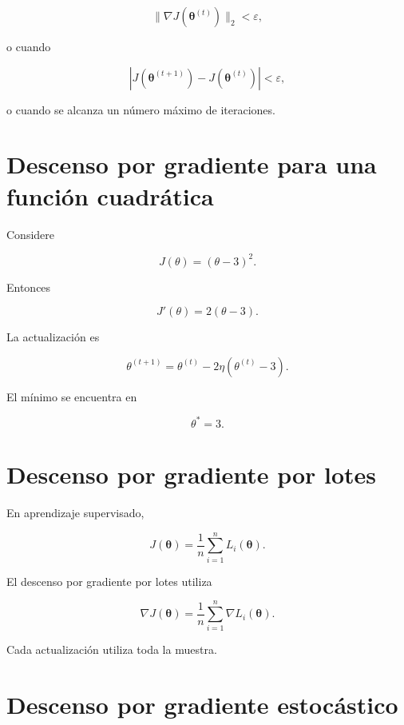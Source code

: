 \documentclass[
  spanish,
  10.5pt,
  letterpaper,
  DIV=11,
  numbers=noendperiod,
  oneside,
  open=any]{scrreprt}
\theoremstyle{definition}
\theoremstyle{definition}
\theoremstyle{plain}
\theoremstyle{remark}
\begin{document}
\[
\|
\nabla J(\boldsymbol{\theta}^{(t)})
\|_2
<
\varepsilon,
\]

o cuando

\[
|
J(\boldsymbol{\theta}^{(t+1)})
-
J(\boldsymbol{\theta}^{(t)})
|
<
\varepsilon,
\]

o cuando se alcanza un número máximo de iteraciones.

\section*{Descenso por gradiente para una función
cuadrática}\label{descenso-por-gradiente-para-una-funciuxf3n-cuadruxe1tica}


Considere

\[
J(\theta)
=
(\theta-3)^2.
\]

Entonces

\[
J'(\theta)
=
2(\theta-3).
\]

La actualización es

\[
\theta^{(t+1)}
=
\theta^{(t)}
-
2\eta
(
\theta^{(t)}-3
).
\]

El mínimo se encuentra en

\[
\theta^{*}=3.
\]

\section*{Descenso por gradiente por
lotes}\label{descenso-por-gradiente-por-lotes}


En aprendizaje supervisado,

\[
J(\boldsymbol{\theta})
=
\frac{1}{n}
\sum_{i=1}^{n}
L_i(\boldsymbol{\theta}).
\]

El descenso por gradiente por lotes utiliza

\[
\nabla J(\boldsymbol{\theta})
=
\frac{1}{n}
\sum_{i=1}^{n}
\nabla L_i(\boldsymbol{\theta}).
\]

Cada actualización utiliza toda la muestra.

\section*{Descenso por gradiente
estocástico}\label{descenso-por-gradiente-estocuxe1stico}
\end{document}
